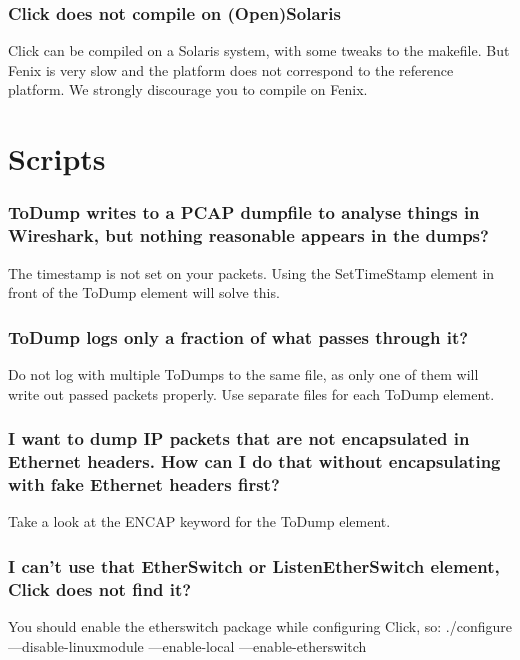 \documentclass[a4paper]{article}
\begin{document}
\subsubsection*{Click does not compile on (Open)Solaris}

Click can be compiled on a Solaris system, with some tweaks to the
makefile. But Fenix is very slow and the platform does not correspond to
the reference platform. We strongly discourage you to compile on Fenix.



\section{Scripts}

\subsubsection*{ToDump writes to a PCAP dumpfile to analyse things in Wireshark, but nothing
reasonable appears in the dumps?}

The timestamp is not set on your packets. Using the SetTimeStamp element
in front of the ToDump element will solve this.

\subsubsection*{ToDump logs only a fraction of what passes through it?}

Do not log with multiple ToDumps to the same file, as only one of them
will write out passed packets properly. Use separate files for each
ToDump element.

\subsubsection*{I want to dump IP packets that are not encapsulated in Ethernet headers.
How can I do that without encapsulating with fake Ethernet headers
first?}

Take a look at the ENCAP keyword for the ToDump element.

\subsubsection*{I can't use that EtherSwitch or ListenEtherSwitch element, Click does
not find it?}

You should enable the etherswitch package while configuring Click, so:
./configure ---disable-linuxmodule ---enable-local ---enable-etherswitch
\end{document}
